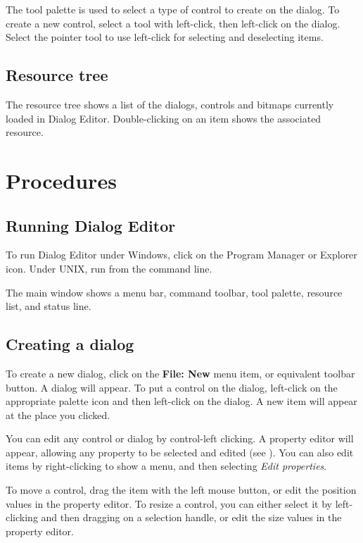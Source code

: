 The tool palette is used to select a type of control to create on the dialog.
To create a new control, select a tool with left-click, then left-click on the dialog.
Select the pointer tool to use left-click for selecting and deselecting
items.

\section{Resource tree}

The resource tree shows a list of the dialogs, controls and bitmaps currently loaded
in Dialog Editor. Double-clicking on an item shows the associated resource.

\chapter{Procedures}\label{procedures}
%
\setfooter{\thepage}{}{}{}{}{\thepage}%

\section{Running Dialog Editor}

To run Dialog Editor under Windows, click on the Program Manager or Explorer icon.
Under UNIX, run from the command line.

The main window shows a menu bar, command toolbar, tool palette, resource list, and
status line.

\section{Creating a dialog}

To create a new dialog, click on the {\bf File: New} menu item, or equivalent
toolbar button. A dialog will appear. To put a control on the dialog, left-click
on the appropriate palette icon and then left-click on the dialog. A new item
will appear at the place you clicked.

You can edit any control or dialog by control-left clicking. A property editor
will appear, allowing any property to be selected and edited (see ).
You can also edit items by right-clicking to show a menu, and then selecting {\it Edit properties}.

To move a control, drag the item with the left mouse button, or edit
the position values in the property editor. To resize a control, you
can either select it by left-clicking and then dragging on a selection
handle, or edit the size values in the property editor. 

